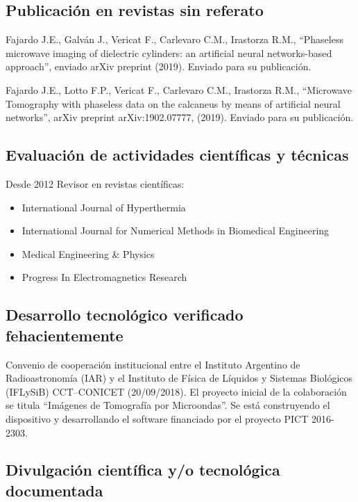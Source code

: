 \documentclass[margin,line]{res}
\begin{document}
\begin{resume}
\subsection{ Publicación en revistas sin referato}

Fajardo J.E., Galván J., Vericat F., Carlevaro C.M., Irastorza R.M., ``Phaseless microwave imaging of dielectric cylinders: an artificial neural networks-based approach'', enviado arXiv preprint (2019). Enviado para su publicación.

Fajardo J.E., Lotto F.P., Vericat F., Carlevaro C.M., Irastorza R.M., ``Microwave Tomography with phaseless data on the calcaneus by means of artificial neural networks'', arXiv preprint arXiv:1902.07777, (2019). Enviado para su publicación.

\subsection{ Evaluación de actividades científicas y técnicas}

Desde 2012 Revisor en revistas científicas:\\
\begin{itemize}
 \item International Journal of Hyperthermia
 \item International Journal for Numerical Methods in Biomedical Engineering
 \item Medical Engineering \& Physics
 \item Progress In Electromagnetics Research
\end{itemize}

\subsection{ Desarrollo tecnológico verificado fehacientemente}

Convenio de cooperación institucional entre el Instituto Argentino de Radioastronomía (IAR) y el Instituto de Física de Líquidos y Sistemas Biológicos (IFLySiB) CCT--CONICET (20/09/2018). El proyecto inicial de la colaboración se titula ``Imágenes de Tomografía por Microondas''. Se está construyendo el dispositivo y desarrollando el software financiado por el proyecto PICT 2016-2303.

\subsection{ Divulgación científica y/o tecnológica documentada}


\end{resume}
\end{document}
